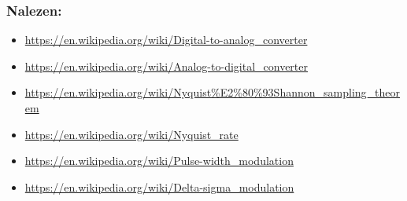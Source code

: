 \documentclass{article}
\begin{document}
\subsubsection{Nalezen:}
\begin{itemize}
    \item \url{https://en.wikipedia.org/wiki/Digital-to-analog_converter}
    \item \url{https://en.wikipedia.org/wiki/Analog-to-digital_converter}
    \item \url{https://en.wikipedia.org/wiki/Nyquist%E2%80%93Shannon_sampling_theorem}
    \item \url{https://en.wikipedia.org/wiki/Nyquist_rate}
    \item \url{https://en.wikipedia.org/wiki/Pulse-width_modulation}
    \item \url{https://en.wikipedia.org/wiki/Delta-sigma_modulation}
\end{itemize}
\end{document}
